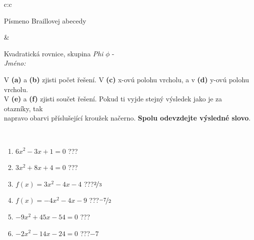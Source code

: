 \documentclass[10pt]{report}
\begin{document}
\begin{tabular}{c:c}
\begin{minipage}[c][104.5mm][t]{0.5\linewidth}
\begin{center}
\begin{minipage}{0.20\linewidth}
\begin{center}
{\small Písmeno Braillovej abecedy}
\end{center}
\end{minipage}
\end{center}
\end{minipage}
&
\begin{minipage}[c][104.5mm][t]{0.5\linewidth}
\begin{center}
\vspace{7mm}
{\huge Kvadratická rovnice, skupina \textit{Phi $\phi$} -}\\[5mm]
\textit{Jméno:}\phantom{xxxxxxxxxxxxxxxxxxxxxxxxxxxxxxxxxxxxxxxxxxxxxxxxxxxxxxxxxxxxxxxxx}\\[5mm]
\begin{minipage}{0.95\linewidth}
\begin{center}
V \textbf{(a)} a \textbf{(b)} zjisti počet řešení. V \textbf{(c)} x-ovú polohu vrcholu, a v \textbf{(d)} y-ovú polohu vrcholu.\\V \textbf{(e)} a \textbf{(f)} zjisti součet řešení. Pokud ti vyjde stejný výsledek jako je za otazníky, tak\\napravo obarvi příslušející kroužek načerno. \textbf{Spolu odevzdejte výsledné slovo}.
\end{center}
\end{minipage}
\\[1mm]
\begin{minipage}{0.79\linewidth}
\begin{center}
\begin{varwidth}{\linewidth}
\begin{enumerate}
\Large
\item $6x^2-3x+1=0$\quad \dotfill\; ???\;\dotfill {}
\item $3x^2+8x+4=0$\quad \dotfill\; ???\;\dotfill {}
\item $f(x)=3x^2-4x-4$\quad \dotfill\; ???\;\dotfill \quad $\nicefrac{2}{3}$
\item $f(x)=-4x^2-4x-9$\quad \dotfill\; ???\;\dotfill \quad $\nicefrac{-7}{2}$
\item $-9x^2+45x-54=0$\quad \dotfill\; ???\;\dotfill {}
\item $-2x^2-14x-24=0$\quad \dotfill\; ???\;\dotfill \quad $-7$
\end{enumerate}
\end{varwidth}
\end{center}
\end{minipage}
\begin{minipage}{0.20\linewidth}
\begin{center}

\end{center}
\end{minipage}
\end{center}
\end{minipage}
\end{tabular}
\end{document}

